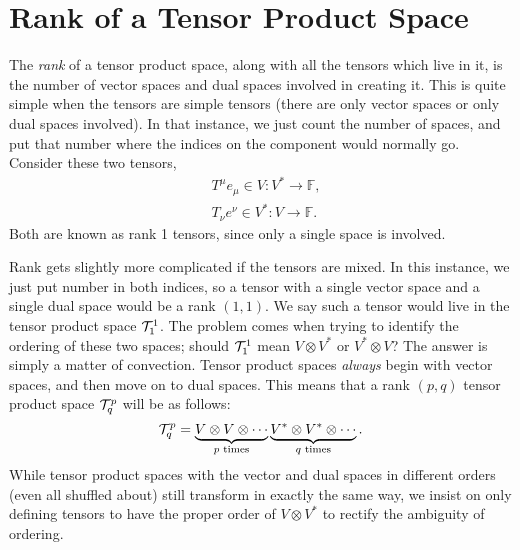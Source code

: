 \chapter{Rank of a Tensor Product Space}
The \emph{rank} of a tensor product space, along with all the tensors which live in it, is the number of vector spaces and dual spaces involved in creating it.
This is quite simple when the tensors are simple tensors (there are only vector spaces or only dual spaces involved).
In that instance, we just count the number of spaces, and put that number where the indices on the component would normally go.
Consider these two tensors,
\begin{align*}
    &T^\mu e_\mu \in V : V^* \to \mathbb{F}, \\
    &T_\nu e^\nu \in V^* : V \to \mathbb{F}.
\end{align*}
Both are known as rank 1 tensors, since only a single space is involved.

Rank gets slightly more complicated if the tensors are mixed.
In this instance, we just put number in both indices, so a tensor with a single vector space and a single dual space would be a rank $(1,1)$. We say such a tensor would live in the tensor product space $\mathcal{T}^1_1$. The problem comes when trying to identify the ordering of these two spaces; should $\mathcal{T}^1_1$ mean $V \otimes V^*$ or $V^* \otimes V$? The answer is simply a matter of convection. Tensor product spaces \emph{always} begin with vector spaces, and then move on to dual spaces.
This means that a rank $(p,q)$ tensor product space $\mathcal{T}^p_q$ will be as follows:
\[ \mathcal{T}^p_q = \underbrace{V \otimes V \otimes \cdots}_{\text{$p$ times}} \underbrace{V^* \otimes V^* \otimes \cdots}_{\text{$q$ times}}. \]
While tensor product spaces with the vector and dual spaces in different orders (even all shuffled about) still transform in exactly the same way, we insist on only defining tensors to have the proper order of $V \otimes V^*$ to rectify the ambiguity of ordering.
